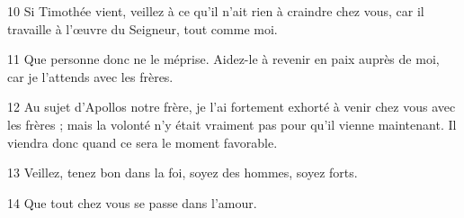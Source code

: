 
10 Si Timothée vient, veillez à ce qu’il n’ait rien à craindre chez vous, car il travaille à l’œuvre du Seigneur, tout comme moi.

11 Que personne donc ne le méprise. Aidez-le à revenir en paix auprès de moi, car je l’attends avec les frères.

12 Au sujet d’Apollos notre frère, je l’ai fortement exhorté à venir chez vous avec les frères ; mais la volonté n’y était vraiment pas pour qu’il vienne maintenant. Il viendra donc quand ce sera le moment favorable.

13 Veillez, tenez bon dans la foi, soyez des hommes, soyez forts.

14 Que tout chez vous se passe dans l’amour.